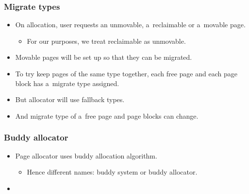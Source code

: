 \begin{frame}[fragile]
  \frametitle{Migrate types}

  \begin{itemize}
  \item On allocation, user requests an unmovable, a~reclaimable or
    a~movable page.
    \begin{itemize}
    \item For our purposes, we treat reclaimable as unmovable.
    \end{itemize}
  \item Movable pages will be set up so that they can be migrated.
  \end{itemize}

  \begin{itemize}
  \item To try keep pages of the same type together, each free page
    and each page block has a~migrate type assigned.
  \item But allocator will use fallback types.
  \item And migrate type of a~free page and page blocks can change.
  \end{itemize}
\end{frame}

\begin{frame}
  \frametitle{Buddy allocator}

  \begin{itemize}
  \item Page allocator uses buddy allocation algorithm.
    \begin{itemize}
    \item Hence different names: buddy system or buddy allocator.
    \end{itemize}
  \item
  \end{itemize}
\end{frame}
